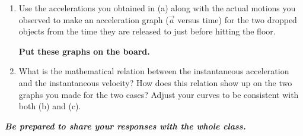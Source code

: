 \begin{enumerate}
\begin{enumerate}
		\item Use the accelerations you obtained in (a) along with the actual motions you observed to make an acceleration graph ($\vec{a}$ versus time) for the two dropped objects from the time they are released to just before hitting the floor.
		
			\textbf{Put these graphs on the board.}
		
		\item What is the mathematical relation between the instantaneous acceleration and the instantaneous velocity? How does this relation show up on the two graphs you made for the two cases? Adjust your curves to be consistent with both (b) and (c).
	\end{enumerate}
\end{enumerate}

\textbf{\em Be prepared to share your responses with the whole class.}

\WCD

